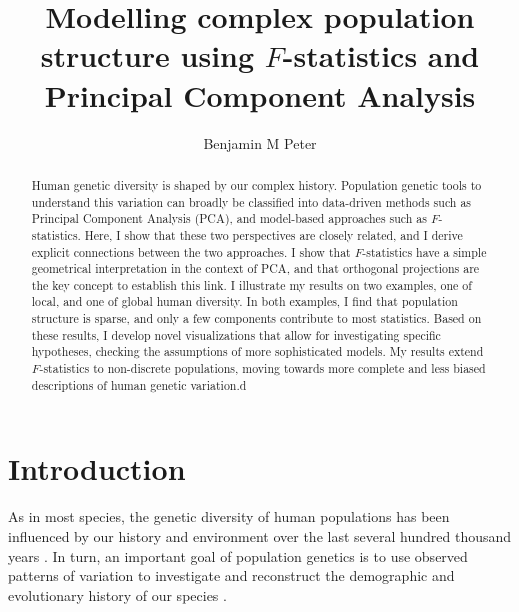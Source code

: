 \documentclass[12pt,fullpage, a4paper]{article}
\title{Modelling complex population structure using $F$-statistics and Principal Component Analysis}
\author{Benjamin M Peter}
\begin{document}
	\maketitle
\begin{abstract}
Human  genetic diversity is shaped by our complex history. Population genetic tools to understand this variation can broadly be classified into data-driven methods such as Principal Component Analysis (PCA), and model-based approaches such as $F$-statistics.
Here, I show that these two perspectives are closely related, and I derive explicit connections between the two approaches. I show that $F$-statistics have a simple geometrical interpretation in the context of PCA, and that orthogonal projections are the key concept to establish this link. I illustrate my results on two examples, one of local, and one of global human diversity. In both examples, I find that population structure is sparse, and only a few components contribute to most statistics. Based on these results, I develop novel visualizations that allow for investigating specific hypotheses, checking the assumptions of more sophisticated models. My results extend $F$-statistics to non-discrete populations, moving towards more complete and less biased descriptions of human genetic variation.d
\end{abstract}
\section{Introduction}
As in most species, the genetic diversity of human populations has been influenced by our history and environment over the last several hundred thousand years \citep[e.g][]{cavalli-sforza1994,marciniak2017, reich2018a, nielsen2020}. In turn, an important goal of population genetics is to use observed patterns of variation to  investigate and reconstruct the demographic and evolutionary history of our species \citep{schraiber2015, orlando2021}. 
\end{document}
